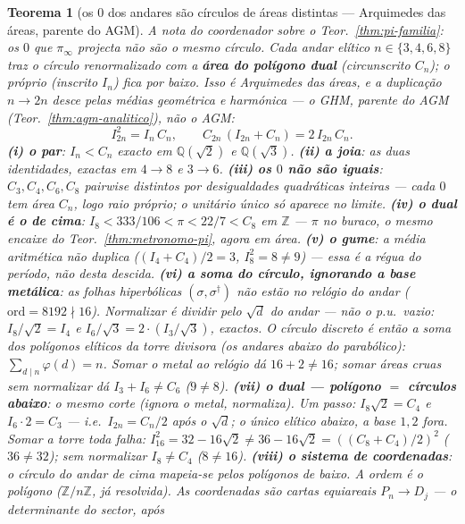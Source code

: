 \documentclass[11pt,a4paper]{article}
\newtheorem{teorema}{Teorema}
\begin{document}
\begin{teorema}[os $0$ dos andares são círculos de áreas distintas ---
Arquimedes das áreas, parente do AGM]\label{thm:area-andares}
A nota do coordenador sobre o Teor.~\ref{thm:pi-familia}: os $0$ que
$\pi_{\infty}$ projecta \emph{não são o mesmo círculo}. Cada andar
elítico $n\in\{3,4,6,8\}$ traz o círculo renormalizado com a
\textbf{área do polígono dual} (circunscrito $C_{n}$); o próprio
(inscrito $I_{n}$) fica por baixo. Isso é Arquimedes das áreas, e a
duplicação $n\to 2n$ desce pelas médias \emph{geométrica} e
\emph{harmónica} --- o GHM, parente do AGM (Teor.~\ref{thm:agm-analitico}),
não o AGM:
\[
I_{2n}^{2}=I_{n}\,C_{n},\qquad
C_{2n}\,(I_{2n}+C_{n})=2\,I_{2n}\,C_{n}.
\]
\textbf{(i) o par}: $I_{n}<C_{n}$ exacto em $\mathbb{Q}(\sqrt2)$ e
$\mathbb{Q}(\sqrt3)$.
\textbf{(ii) a joia}: as duas identidades, exactas em $4\to8$ e
$3\to6$.
\textbf{(iii) os $0$ não são iguais}: $C_{3},C_{4},C_{6},C_{8}$
pairwise distintos por desigualdades quadráticas inteiras --- cada $0$
tem área $C_{n}$, logo raio próprio; o unitário único só aparece no
limite.
\textbf{(iv) o dual é o de cima}: $I_{8}<333/106<\pi<22/7<C_{8}$ em
$\mathbb{Z}$ --- $\pi$ no buraco, o mesmo encaixe do
Teor.~\ref{thm:metronomo-pi}, agora em área.
\textbf{(v) o gume}: a média aritmética \emph{não} duplica
($(I_{4}+C_{4})/2=3$, $I_{8}^{2}=8\neq9$) --- essa é a régua do
período, não desta descida.
\textbf{(vi) a soma do círculo, ignorando a base metálica}: as folhas
hiperbólicas $(\sigma,\sigma^{\dagger})$ \emph{não} estão no relógio
do andar ($\mathrm{ord}=8192\nmid 16$). Normalizar é dividir pelo
$\sqrt{d}$ do andar --- não o p.u.\ vazio:
$I_{8}/\sqrt2=I_{4}$ e $I_{6}/\sqrt3=2\cdot(I_{3}/\sqrt3)$, exactos.
O círculo discreto é então a soma dos polígonos \emph{elíticos} da
torre divisora (os andares abaixo do parabólico):
$\sum_{d\mid n}\varphi(d)=n$.
Somar o metal ao relógio dá $16+2\neq16$; somar áreas cruas sem
normalizar dá $I_{3}+I_{6}\neq C_{6}$ ($9\neq8$).
\textbf{(vii) o dual --- polígono $=$ círculos abaixo}: o mesmo corte
(ignora o metal, normaliza). Um passo:
$I_{8}\sqrt2=C_{4}$ e $I_{6}\cdot 2=C_{3}$ --- i.e.\ $I_{2n}=C_{n}/2$
após o $\sqrt{d}$; o único elítico abaixo, a base $1,2$ fora.
Somar a \emph{torre} toda falha:
$I_{16}^{2}=32-16\sqrt2\neq36-16\sqrt2=((C_{8}+C_{4})/2)^{2}$
($36\neq32$); sem normalizar $I_{8}\neq C_{4}$ ($8\neq16$).
\textbf{(viii) o sistema de coordenadas}: o círculo do andar de cima
mapeia-se pelos polígonos de baixo. A \emph{ordem} é o polígono
($\mathbb{Z}/n\mathbb{Z}$, já resolvida). As \emph{coordenadas} são
cartas equiareais $P_{n}\to D_{j}$ --- o determinante do sector, após

\end{teorema}
\end{document}
